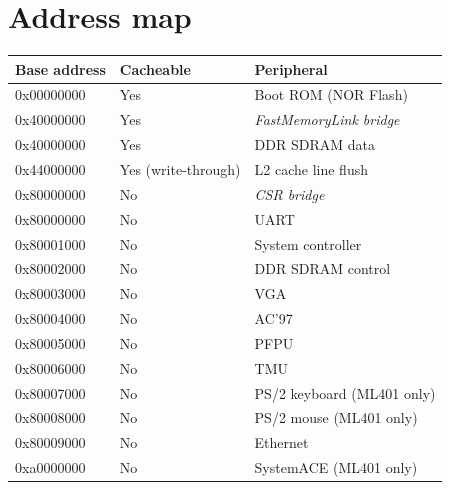 \documentclass[a4paper,11pt]{article}
\begin{document}
\section{Address map}

\begin{tabularx}{\textwidth}{|l|l|X|}
\hline
\bf{Base address} & \bf{Cacheable} & \bf{Peripheral} \\
\hline
0x00000000 & Yes & Boot ROM (NOR Flash) \\
\hline
0x40000000 & Yes & \textit{FastMemoryLink bridge} \\
\hline
\hspace{5mm} 0x40000000 & Yes & \hspace{5mm} DDR SDRAM data \\
\hline
\hspace{5mm} 0x44000000 & Yes (write-through) & \hspace{5mm} L2 cache line flush \\
\hline
0x80000000 & No & \textit{CSR bridge} \\
\hline
\hspace{5mm} 0x80000000 & No & \hspace{5mm} UART \\
\hline
\hspace{5mm} 0x80001000 & No & \hspace{5mm} System controller \\
\hline
\hspace{5mm} 0x80002000 & No & \hspace{5mm} DDR SDRAM control \\
\hline
\hspace{5mm} 0x80003000 & No & \hspace{5mm} VGA \\
\hline
\hspace{5mm} 0x80004000 & No & \hspace{5mm} AC'97 \\
\hline
\hspace{5mm} 0x80005000 & No & \hspace{5mm} PFPU \\
\hline
\hspace{5mm} 0x80006000 & No & \hspace{5mm} TMU \\
\hline
\hspace{5mm} 0x80007000 & No & \hspace{5mm} PS/2 keyboard (ML401 only) \\
\hline
\hspace{5mm} 0x80008000 & No & \hspace{5mm} PS/2 mouse (ML401 only) \\
\hline
\hspace{5mm} 0x80009000 & No & \hspace{5mm} Ethernet \\
\hline
0xa0000000 & No & SystemACE (ML401 only) \\
\hline
\end{tabularx}
\end{document}
